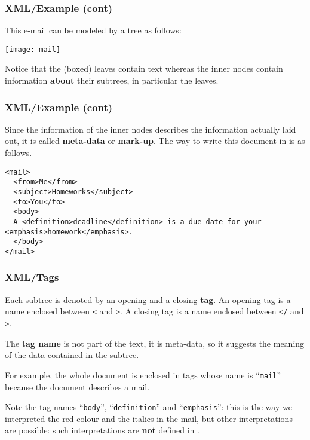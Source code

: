 %
\begin{frame}
\frametitle{XML/Example (cont)}

This e-mail can be modeled by a tree as follows:
\begin{center}
\texttt{[image: mail]}
\end{center}
Notice that the (boxed) leaves contain text whereas the inner nodes
contain information \textbf{about} their subtrees, in particular the
leaves.

\end{frame}

%
\begin{frame}[containsverbatim]
\frametitle{XML/Example (cont)}

Since the information of the inner nodes describes the information
actually laid out, it is called \textbf{meta-data} or
\textbf{mark-up}. The way to write this document in \XML is as
follows.
{\small
\begin{verbatim}
<mail>
  <from>Me</from>
  <subject>Homeworks</subject>
  <to>You</to>
  <body>
  A <definition>deadline</definition> is a due date for your
<emphasis>homework</emphasis>.
  </body>
</mail>
\end{verbatim}
}

\end{frame}

%
\begin{frame}
\frametitle{XML/Tags}

Each subtree is denoted by an opening and a closing \textbf{tag}. An
opening tag is a name enclosed between \texttt{<} and \texttt{>}. A
closing tag is a name enclosed between \texttt{</} and \texttt{>}. 

\bigskip

The \textbf{tag name} is not part of the text, it is meta-data, so it
suggests the meaning of the data contained in the subtree.

\bigskip

For example, the whole \XML document is enclosed in tags whose name is
``\texttt{mail}'' because the document describes a mail.

\bigskip

Note the tag names ``\texttt{body}'', ``\texttt{definition}'' and
``\texttt{emphasis}'': this is the way we interpreted the red colour
and the italics in the mail, but other interpretations are possible:
such interpretations are \textbf{not} defined in \XML.

\end{frame}

